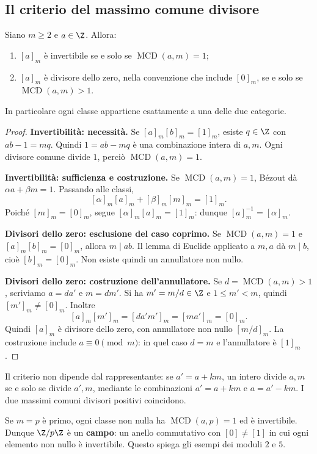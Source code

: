 \subsection{Il criterio del massimo comune divisore}
\begin{teorema}\label{teo:unita-modulari}
Siano $m\ge2$ e $a\in\Z$. Allora:
\begin{enumerate}
\item $[a]_m$ è invertibile se e solo se $\operatorname{MCD}(a,m)=1$;
\item $[a]_m$ è divisore dello zero, nella convenzione che include $[0]_m$, se e solo se $\operatorname{MCD}(a,m)>1$.
\end{enumerate}
In particolare ogni classe appartiene esattamente a una delle due categorie.
\end{teorema}
\begin{proof}
\textbf{Invertibilità: necessità.} Se $[a]_m[b]_m=[1]_m$, esiste $q\in\Z$ con $ab-1=mq$. Quindi $1=ab-mq$ è una combinazione intera di $a,m$. Ogni divisore comune divide $1$, perciò $\operatorname{MCD}(a,m)=1$.

\textbf{Invertibilità: sufficienza e costruzione.} Se $\operatorname{MCD}(a,m)=1$, Bézout dà $\alpha a+\beta m=1$. Passando alle classi,
\[
[\alpha]_m[a]_m+[\beta]_m[m]_m=[1]_m.
\]
Poiché $[m]_m=[0]_m$, segue $[\alpha]_m[a]_m=[1]_m$: dunque $[a]_m^{-1}=[\alpha]_m$.

\textbf{Divisori dello zero: esclusione del caso coprimo.} Se $\operatorname{MCD}(a,m)=1$ e $[a]_m[b]_m=[0]_m$, allora $m\mid ab$. Il lemma di Euclide applicato a $m,a$ dà $m\mid b$, cioè $[b]_m=[0]_m$. Non esiste quindi un annullatore non nullo.

\textbf{Divisori dello zero: costruzione dell'annullatore.} Se $d=\operatorname{MCD}(a,m)>1$, scriviamo $a=da'$ e $m=dm'$. Si ha $m'=m/d\in\Z$ e $1\le m'<m$, quindi $[m']_m\ne[0]_m$. Inoltre
\[
[a]_m[m']_m=[da'm']_m=[ma']_m=[0]_m.
\]
Quindi $[a]_m$ è divisore dello zero, con annullatore non nullo $[m/d]_m$. La costruzione include $a\equiv0\pmod m$: in quel caso $d=m$ e l'annullatore è $[1]_m$.
\end{proof}

\begin{osservazione}
Il criterio non dipende dal rappresentante: se $a'=a+km$, un intero divide $a,m$ se e solo se divide $a',m$, mediante le combinazioni $a'=a+km$ e $a=a'-km$. I due massimi comuni divisori positivi coincidono.

Se $m=p$ è primo, ogni classe non nulla ha $\operatorname{MCD}(a,p)=1$ ed è invertibile. Dunque $\Z/p\Z$ è un \textbf{campo}: un anello commutativo con $[0]\ne[1]$ in cui ogni elemento non nullo è invertibile. Questo spiega gli esempi dei moduli $2$ e $5$.
\end{osservazione}

